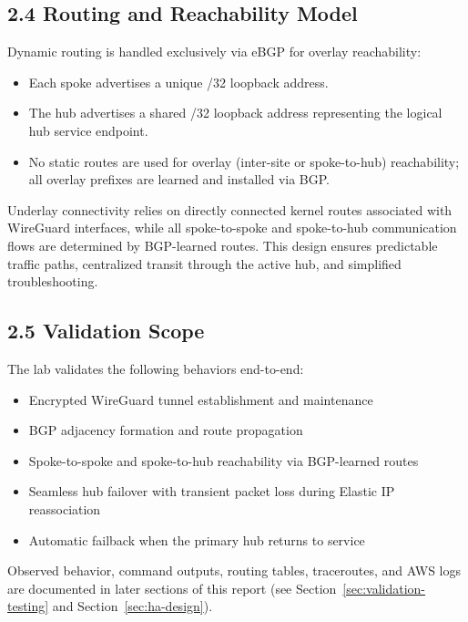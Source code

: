 \documentclass[11pt]{article}
\begin{document}
\subsection{2.4 Routing and Reachability Model}
\label{sec:routing-model}

Dynamic routing is handled exclusively via eBGP for overlay reachability:

\begin{itemize}
  \item Each spoke advertises a unique /32 loopback address.
  \item The hub advertises a shared /32 loopback address representing the logical hub service endpoint.
  \item No static routes are used for overlay (inter-site or spoke-to-hub) reachability; all overlay prefixes are learned and installed via BGP.
\end{itemize}

Underlay connectivity relies on directly connected kernel routes associated with WireGuard interfaces, while all spoke-to-spoke and spoke-to-hub communication flows are determined by BGP-learned routes. This design ensures predictable traffic paths, centralized transit through the active hub, and simplified troubleshooting.

\subsection{2.5 Validation Scope}
\label{sec:validation-scope}

The lab validates the following behaviors end-to-end:

\begin{itemize}
  \item Encrypted WireGuard tunnel establishment and maintenance
  \item BGP adjacency formation and route propagation
  \item Spoke-to-spoke and spoke-to-hub reachability via BGP-learned routes
  \item Seamless hub failover with transient packet loss during Elastic IP reassociation
  \item Automatic failback when the primary hub returns to service
\end{itemize}

Observed behavior, command outputs, routing tables, traceroutes, and AWS logs are documented in later sections of this report (see Section~\ref{sec:validation-testing} and Section~\ref{sec:ha-design}).
\end{document}
